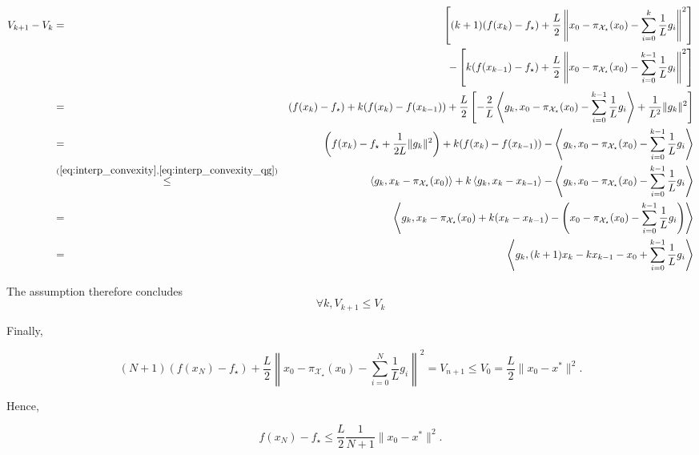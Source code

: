     \begin{eqnarray*}
        V_{k+1} - V_k & = & \left[(k+1)(f(x_{k}) - f_\star) + \frac{L}{2} \left\| x_0 - \pi_{\mathcal{X_\star}}(x_0) - \sum_{i=0}^{k}\frac{1}{L}g_i \right\|^2 \right] \\
        & & - \left[k(f(x_{k-1}) - f_\star) + \frac{L}{2} \left\| x_0 - \pi_{\mathcal{X_\star}}(x_0) - \sum_{i=0}^{k-1}\frac{1}{L} g_i \right\|^2 \right] \\
        & = & (f(x_k) - f_\star) + k(f(x_k) - f(x_{k-1})) + \frac{L}{2} \left[ -\frac{2}{L} \left< g_k , x_0 - \pi_{\mathcal{X_\star}}(x_0) - \sum_{i=0}^{k-1}\frac{1}{L} g_i \right> + \frac{1}{L^2} \|g_k\|^2 \right] \\
        & = & \left(f(x_k) - f_\star + \frac{1}{2L} \|g_k\|^2\right) + k(f(x_k) - f(x_{k-1})) - \left< g_k , x_0 - \pi_{\mathcal{X_\star}}(x_0) - \sum_{i=0}^{k-1}\frac{1}{L} g_i \right> \\
        & \overset{(\ref{eq:interp_convexity}, \ref{eq:interp_convexity_qg})}{\leq} & \left< g_k , x_k - \pi_{\mathcal{X_\star}}(x_0) \right> + k\left< g_k , x_k - x_{k-1} \right> - \left< g_k , x_0 - \pi_{\mathcal{X_\star}}(x_0) - \sum_{i=0}^{k-1}\frac{1}{L} g_i \right> \\
        & = & \left< g_k , x_k - \pi_{\mathcal{X_\star}}(x_0) + k(x_k - x_{k-1}) - \left( x_0 - \pi_{\mathcal{X_\star}}(x_0) - \sum_{i=0}^{k-1}\frac{1}{L} g_i \right) \right> \\
        & = & \left< g_k , (k+1) x_k - k x_{k-1} - x_0 + \sum_{i=0}^{k-1}\frac{1}{L} g_i \right>
    \end{eqnarray*}
    
    The assumption therefore concludes
    \begin{equation*}
        \forall k, V_{k+1} \leq V_k
    \end{equation*}
    
    Finally,
    
    \begin{equation*}
        (N+1)(f(x_{N}) - f_\star) + \frac{L}{2} \left\| x_0 - \pi_{\mathcal{X_\star}}(x_0) - \sum_{i=0}^{N}\frac{1}{L} g_i \right\|^2 = V_{n+1} \leq V_0 = \frac{L}{2}\|x_0 - x^*\|^2.
    \end{equation*}
    
    Hence,
    
    \begin{equation*}
        f(x_{N}) - f_\star \leq \frac{L}{2}\frac{1}{N+1}\|x_0 - x^*\|^2.
    \end{equation*}
    
